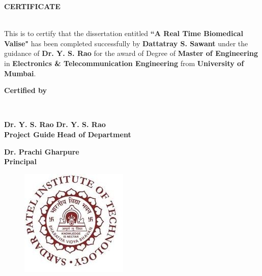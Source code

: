 \newpage
\thispagestyle{empty}
\vspace*{0.2cm}
\vspace{1cm}
\begin{center}
 \large\textbf{CERTIFICATE}
\end{center}\\%
\vspace{1cm}
This is to certify that the dissertation entitled \textbf{``A Real Time Biomedical Valise"} has been completed successfully by \textbf{ Dattatray S. Sawant }under the guidance of \textbf{ Dr. Y. S. Rao} for the award of Degree of\textbf{ Master of Engineering} in \textbf{Electronics \& Telecommunication Engineering} from \textbf{University of Mumbai}.\\
\vspace{1cm}
\begin{center}
\textbf{Certified by}
\end{center}\\
\vspace{1cm}


\textbf {Dr. Y. S. Rao} \hspace{3.6in} \textbf{Dr. Y. S. Rao   }\\ \hspace*{0.5cm}
\textbf {Project Guide} \hspace{3.3in} \textbf{Head of Department} \\
\vspace{1cm}

\begin{center}
\textbf{Dr. Prachi Gharpure}\\
\textbf{Principal}
\end{center}
\vspace{2cm}
\begin{figure}[h]
\centering
\includegraphics[scale=0.8]{spit_logo.jpg}
\end{figure}
\hspace{.05cm}
\hspace{.05cm}


